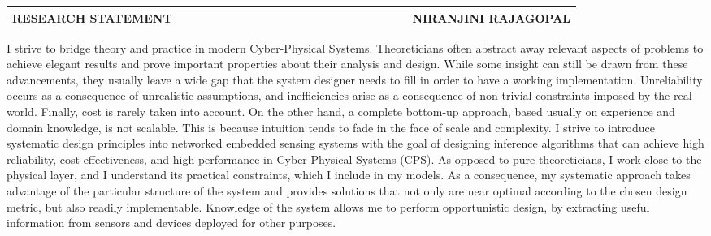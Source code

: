 \documentclass[10pt]{article}
\date{}
\begin{document}


\begin{table}
\color{blue}
\begin{tabular*}{\textwidth}{l r}
\large\textbf{RESEARCH STATEMENT} & 
\hfill \ \ \ \ \ \ \ \ \ \ \ \ \ \ \ \ \ \ \ \
\ \ \ \ \ \ \ \ \ \ \ \ \ \ \
\large\textbf{NIRANJINI RAJAGOPAL}\\
\hline
\end{tabular*}

\end{table}
 

I strive to bridge theory and practice in modern Cyber-Physical Systems. %
Theoreticians often abstract away relevant aspects of problems to achieve elegant results and prove important properties about their analysis and design. While some insight can still be drawn from these advancements, they usually leave a wide gap that the system designer needs to fill in order to have a working implementation. %
Unreliability occurs as a consequence of unrealistic assumptions, and inefficiencies arise as a consequence of non-trivial constraints imposed by the real-world. Finally, cost is rarely taken into account. 
On the other hand, a complete bottom-up approach, based usually on experience and domain knowledge, is not scalable. This is because intuition tends to fade in the face of scale and complexity. I strive to introduce systematic design principles into networked embedded sensing systems with the goal of designing inference algorithms that can achieve high reliability, cost-effectiveness, and high performance in Cyber-Physical Systems (CPS). As opposed to pure theoreticians, I work close to the physical layer, and I understand its practical constraints, which I include in my models. As a consequence, my systematic approach takes advantage of the particular structure of the system and provides solutions that not only are near optimal according to the chosen design metric, but also readily implementable. Knowledge of the system allows me to perform opportunistic design, by extracting useful information from sensors and devices deployed for other purposes. \\
\end{document}
